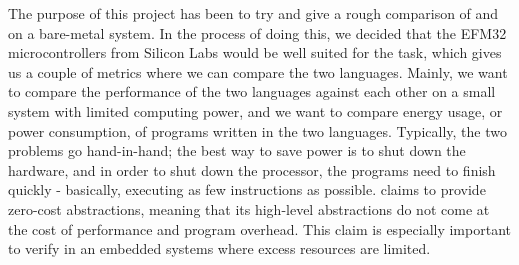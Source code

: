 The purpose of this project has been to try and give a rough comparison of {\rust} and {\C} on a bare-metal system.
In the process of doing this, we decided that the EFM32 microcontrollers from Silicon Labs would be well suited for the task, which gives us a couple of metrics where we can compare the two languages.
Mainly, we want to compare the performance of the two languages against each other on a small system with limited computing power, and we want to compare energy usage, or power consumption, of programs written in the two languages.
Typically, the two problems go hand-in-hand; the best way to save power is to shut down the hardware, and in order to shut down the processor, the programs need to finish quickly - basically, executing as few instructions as possible.
{\rust} claims to provide zero-cost abstractions, meaning that its high-level abstractions do not come at the cost of performance and program overhead.
This claim is especially important to verify in an embedded systems where excess resources are limited.






